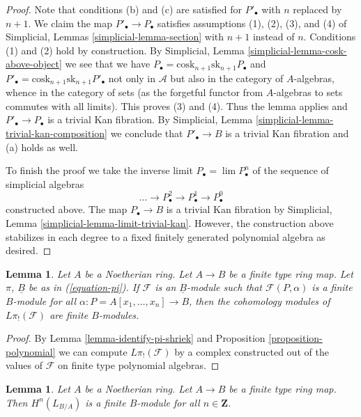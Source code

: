 \documentclass{stacks-project}
\theoremstyle{plain}
\newtheorem{lemma}[subsection]{Lemma}
\theoremstyle{definition}
\theoremstyle{remark}
\numberwithin{equation}{subsection}
\def\lim{\mathop{\mathrm{lim}}\nolimits}
\begin{document}
\begin{proof}
\medskip\noindent
Note that conditions (b) and (c) are satisfied for $P'_\bullet$ with $n$
replaced by $n + 1$. We claim the map $P'_\bullet \to P_\bullet$ satisfies
assumptions (1), (2), (3), and (4) of
Simplicial, Lemmas \ref{simplicial-lemma-section}
with $n + 1$ instead of $n$. Conditions (1) and (2) hold by construction.
By Simplicial, Lemma \ref{simplicial-lemma-cosk-above-object}
we see that we have
$P_\bullet = \text{cosk}_{n + 1}\text{sk}_{n + 1}P_\bullet$
and
$P'_\bullet = \text{cosk}_{n + 1}\text{sk}_{n + 1}P'_\bullet$
not only in $\mathcal{A}$ but also in the category of $A$-algebras,
whence in the category of sets (as the forgetful functor from $A$-algebras
to sets commutes with all limits). This proves (3) and (4). Thus the lemma
applies and $P'_\bullet \to P_\bullet$ is a trivial Kan fibration. By
Simplicial, Lemma \ref{simplicial-lemma-trivial-kan-composition}
we conclude that $P'_\bullet \to B$ is a trivial Kan fibration and (a)
holds as well.

\medskip\noindent
To finish the proof we take the inverse limit $P_\bullet = \lim P^n_\bullet$
of the sequence of simplicial algebras
$$
\ldots \to P^2_\bullet \to P^1_\bullet \to P^0_\bullet
$$
constructed above. The map $P_\bullet \to B$ is a trivial Kan fibration by
Simplicial, Lemma \ref{simplicial-lemma-limit-trivial-kan}.
However, the construction above stabilizes in each degree
to a fixed finitely generated polynomial algebra as desired.
\end{proof}

\begin{lemma}
\label{lemma-pi-shriek-finite}
Let $A$ be a Noetherian ring. Let $A \to B$ be a finite type ring map.
Let $\pi$, $\underline{B}$ be as in (\ref{equation-pi}).
If $\mathcal{F}$ is an $\underline{B}$-module such that
$\mathcal{F}(P, \alpha)$ is a finite $B$-module for all
$\alpha : P = A[x_1, \ldots, x_n] \to B$, then the cohomology modules
of $L\pi_!(\mathcal{F})$ are finite $B$-modules.
\end{lemma}

\begin{proof}
By Lemma \ref{lemma-identify-pi-shriek} and
Proposition \ref{proposition-polynomial}
we can compute $L\pi_!(\mathcal{F})$ by a complex
constructed out of the values of $\mathcal{F}$ on finite type
polynomial algebras.
\end{proof}

\begin{lemma}
\label{lemma-cotangent-finite}
Let $A$ be a Noetherian ring. Let $A \to B$ be a finite type ring map.
Then $H^n(L_{B/A})$ is a finite $B$-module for all $n \in \mathbf{Z}$.
\end{lemma}
\end{document}
